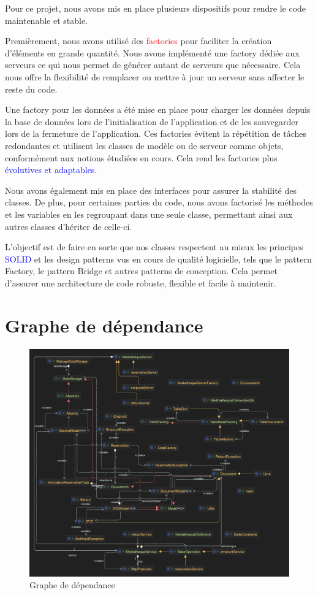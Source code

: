 Pour ce projet, nous avons mis en place plusieurs dispositifs pour rendre le code maintenable et stable.

Premièrement, nous avons utilisé des \textcolor{red}{factories} pour faciliter la création d'éléments en grande quantité. Nous avons implémenté une factory dédiée aux serveurs ce qui nous permet de générer autant de serveurs que nécessaire. Cela nous offre la flexibilité de remplacer ou mettre à jour un serveur sans affecter le reste du code.

Une factory pour les données a été mise en place pour charger les données depuis la base de données lors de l’initialisation de l’application et de les sauvegarder lors de la fermeture de l’application. Ces factories évitent la répétition de tâches redondantes et utilisent les classes de modèle ou de serveur comme objets, conformément aux notions étudiées en cours. Cela rend les factories plus \textcolor{blue}{évolutives et adaptables}.

Nous avons également mis en place des interfaces pour assurer la stabilité des classes. De plus, pour certaines parties du code, nous avons factorisé les méthodes et les variables en les regroupant dans une seule classe, permettant ainsi aux autres classes d’hériter de celle-ci.

L’objectif est de faire en sorte que nos classes respectent au mieux les principes \textcolor{blue}{SOLID} et les design patterns vus en cours de qualité logicielle, tels que le pattern Factory, le pattern Bridge et autres patterns de conception. Cela permet d'assurer une architecture de code robuste, flexible et facile à maintenir.


\section{Graphe de dépendance}

\begin{figure}[H]
    \centering
    \includegraphics[width=1.1\textwidth]{image/uml5}
    \caption{Graphe de dépendance}
    \label{fig:dependency_graph}
\end{figure}


